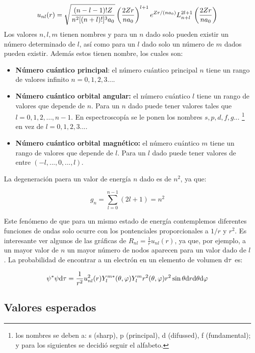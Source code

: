 \begin{equation}
    u_{nl} (r) = \sqrt{\frac{(n-l-1)! Z}{n^2 [(n+l)!]^3a_0}} \left( \frac{2Zr}{na_0} \right)^{l+1} e^{Zr/(na_0)} L_{n+l}^{2l+1} \left( \frac{2Zr}{na_0} \right)
\end{equation}
Los valores $n,l,m$ tienen nombres y para un $n$ dado solo pueden existir un número determinado de $l$, así como para un $l$ dado solo un número de $m$ dados pueden existir. Además estos tienen nombre, los cuales son:

\begin{itemize}
    \item \textbf{Número cuántico principal}: el número cuántico principal $n$ tiene un rango de valores infinito $n=0,1,2,3...$. 
    \item \textbf{Número cuántico orbital angular:} el número cuántico $l$ tiene un rango de valores que depende de $n$. Para un $n$ dado puede tener valores tales que $l=0,1,2,...,n-1$. En espectroscopía se le ponen los nombres $s,p,d,f,g...$ \footnote{los nombres se deben a: s (sharp), p (principal), d (difussed), f (fundamental); y para los siguientes se decidió seguir el alfabeto.} en vez de $l=0,1,2,3...$.
    \item \textbf{Número cuántico orbital magnético:} el número cuántico $m$ tiene un rango de valores que depende de $l$. Para un $l$ dado puede tener valores de entre $(-l,...,0,...,l)$.
\end{itemize}
La degeneración paera un valor de energía $n$ dado es de $n^2$, ya que:

\begin{equation}    
    g_n = \sum_{l=0}^{n-1} (2l+1) = n^2
\end{equation}

Este fenómeno de que para un mismo estado de energía contemplemos diferentes funciones de ondas solo ocurre con los pontenciales proporcionales a $1/r$ y $r^2$. Es interesante ver algunos de las gráficas de $R_{nl} = \frac{1}{r} u_{nl} (r)$, ya que, por ejemplo, a un mayor valor de $n$ un mayor número de nodos aparecen para un valor dado de $l$. La probabilidad de encontrar a un electrón en un elemento de volumen $\mathrm{d} \tau$ es:

\begin{equation}
    \psi^* \psi \mathrm{d} \tau = \frac{1}{r^2} u_{nl}^2 (r) Y_l^{m*} (\theta , \varphi)  Y_l^m r^2 (\theta , \varphi) r^2 \sin \theta \mathrm{d} r \mathrm{d} \theta \mathrm{d} \varphi
\end{equation}


\subsection{Valores esperados}

